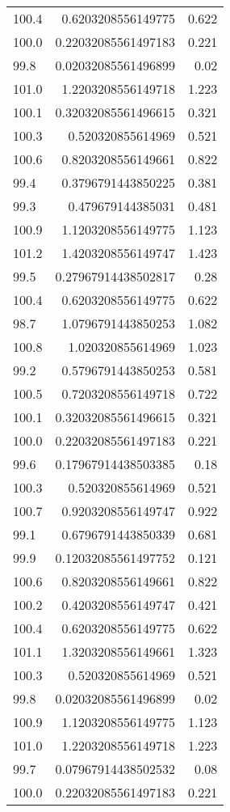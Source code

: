 \begin{table}[h!]
\begin{tabular}{l | r | r}
100.4 & 0.6203208556149775 & 0.622 \\
100.0 & 0.22032085561497183 & 0.221 \\
99.8 & 0.02032085561496899 & 0.02 \\
101.0 & 1.2203208556149718 & 1.223 \\
100.1 & 0.32032085561496615 & 0.321 \\
100.3 & 0.520320855614969 & 0.521 \\
100.6 & 0.8203208556149661 & 0.822 \\
99.4 & 0.3796791443850225 & 0.381 \\
99.3 & 0.479679144385031 & 0.481 \\
100.9 & 1.1203208556149775 & 1.123 \\
101.2 & 1.4203208556149747 & 1.423 \\
99.5 & 0.27967914438502817 & 0.28 \\
100.4 & 0.6203208556149775 & 0.622 \\
98.7 & 1.0796791443850253 & 1.082 \\
100.8 & 1.020320855614969 & 1.023 \\
99.2 & 0.5796791443850253 & 0.581 \\
100.5 & 0.7203208556149718 & 0.722 \\
100.1 & 0.32032085561496615 & 0.321 \\
100.0 & 0.22032085561497183 & 0.221 \\
99.6 & 0.17967914438503385 & 0.18 \\
100.3 & 0.520320855614969 & 0.521 \\
100.7 & 0.9203208556149747 & 0.922 \\
99.1 & 0.6796791443850339 & 0.681 \\
99.9 & 0.12032085561497752 & 0.121 \\
100.6 & 0.8203208556149661 & 0.822 \\
100.2 & 0.4203208556149747 & 0.421 \\
100.4 & 0.6203208556149775 & 0.622 \\
101.1 & 1.3203208556149661 & 1.323 \\
100.3 & 0.520320855614969 & 0.521 \\
99.8 & 0.02032085561496899 & 0.02 \\
100.9 & 1.1203208556149775 & 1.123 \\
101.0 & 1.2203208556149718 & 1.223 \\
99.7 & 0.07967914438502532 & 0.08 \\
100.0 & 0.22032085561497183 & 0.221 \\

\end{tabular}
\end{table}
